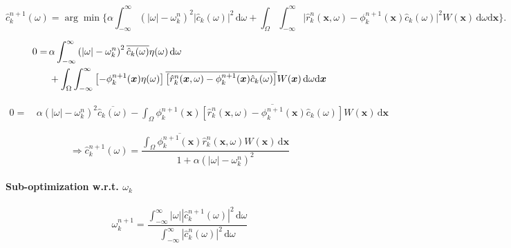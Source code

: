 \documentclass[12pt]{article}
\numberwithin{equation}{section}
\begin{document}
\begin{equation}
	\hat{c}_k^{n+1}(\omega)=\arg\min	\Bigg\{
		\alpha\int_{-\infty}^\infty \left(|\omega|-\omega^n_k\right)^2 \left|\hat{c}_k(\omega)\right|^2\,\mathrm{d}\omega
		+\int_\Omega\int_{-\infty}^\infty \bigg|\hat{r}_k^n(\boldsymbol{x},\omega)-\phi^{n+1}_k(\boldsymbol{x})\hat{c}_k(\omega)\bigg|^2 W(\bm{x})\,\mathrm{d}\omega\mathrm{d}\boldsymbol{x}
	\Bigg\}.
\end{equation}

\begin{align}
	0=&\,
	\alpha\int_{-\infty}^\infty \left(|\omega|-\omega^n_k\right)^2 \overline{\hat{c}_k(\omega)}\eta(\omega)\,\mathrm{d}\omega	\notag\\
		&\,+\int_\Omega\int_{-\infty}^\infty \left[-\phi^{n+1}_k(\boldsymbol{x})\eta(\omega)\right]\overline{\left[\hat{r}_k^n(\boldsymbol{x},\omega)-\phi^{n+1}_k(\boldsymbol{x})\hat{c}_k(\omega)\right]} W(\bm{x})\,\mathrm{d}\omega\mathrm{d}\boldsymbol{x}
\end{align}

\begin{align}
	0=&\,
	\alpha \left(|\omega|-\omega^n_k\right)^2 \overline{\hat{c}_k(\omega)}
		-\int_\Omega \phi^{n+1}_k(\boldsymbol{x})\overline{\left[\hat{r}_k^n(\boldsymbol{x},\omega)-\phi^{n+1}_k(\boldsymbol{x})\hat{c}_k(\omega)\right]} W(\bm{x})\,\mathrm{d}\boldsymbol{x}
\end{align}

\begin{equation}
	\Rightarrow \hat{c}_k^{n+1}(\omega)=
	\frac{\int_\Omega \overline{\phi^{n+1}_k(\boldsymbol{x})} {\hat{r}_k^n(\boldsymbol{x},\omega)} W(\bm{x})\,\mathrm{d}\boldsymbol{x}}{1+\alpha \left(|\omega|-\omega^n_k\right)^2}
\end{equation}

\paragraph{Sub-optimization w.r.t. $\omega_k$}

\begin{equation}
	\omega_k^{n+1}=\frac{\int_{-\infty}^\infty |\omega||{\hat{c}_k^{n+1}(\omega)}|^2 \,\mathrm{d}\omega}{\int_{-\infty}^\infty |{\hat{c}_k^n(\omega)}|^2\,\mathrm{d}\omega}
\end{equation}

\end{document}
